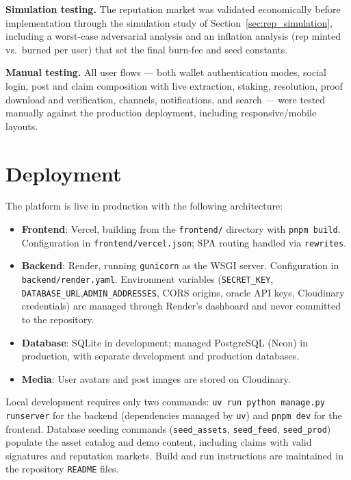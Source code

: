 \documentclass[a4paper,12pt]{report}
\begin{document}
\textbf{Simulation testing.} The reputation market was validated economically before implementation through the simulation study of Section~\ref{sec:rep_simulation}, including a worst-case adversarial analysis and an inflation analysis (rep minted vs.\ burned per user) that set the final burn-fee and seed constants.

\textbf{Manual testing.} All user flows --- both wallet authentication modes, social login, post and claim composition with live extraction, staking, resolution, proof download and verification, channels, notifications, and search --- were tested manually against the production deployment, including responsive/mobile layouts.

\section{Deployment}

The platform is live in production with the following architecture:

\begin{itemize}
    \item \textbf{Frontend}: Vercel, building from the \texttt{frontend/} directory with \texttt{pnpm build}. Configuration in \texttt{frontend/vercel.json}; SPA routing handled via \texttt{rewrites}.
    \item \textbf{Backend}: Render, running \texttt{gunicorn} as the WSGI server. Configuration in \texttt{backend/render.yaml}. Environment variables (\texttt{SECRET\_KEY}, \texttt{DATABASE\_URL},\linebreak[4] \texttt{ADMIN\_ADDRESSES}, CORS origins, oracle API keys, Cloudinary credentials) are managed through Render's dashboard and never committed to the repository.
    \item \textbf{Database}: SQLite in development; managed PostgreSQL (Neon) in production, with separate development and production databases.
    \item \textbf{Media}: User avatars and post images are stored on Cloudinary.
\end{itemize}

Local development requires only two commands: \texttt{uv run python manage.py runserver} for the backend (dependencies managed by \texttt{uv}) and \texttt{pnpm dev} for the frontend. Database seeding commands (\texttt{seed\_assets}, \texttt{seed\_feed}, \texttt{seed\_prod}) populate the asset catalog and demo content, including claims with valid signatures and reputation markets. Build and run instructions are maintained in the repository \texttt{README} files.
\end{document}
